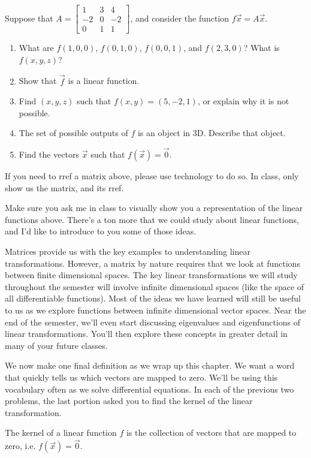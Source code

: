 \begin{problem}
 Suppose that 
$A=
\begin{bmatrix}
 1&3&4\\
 -2&0&-2\\
 0&1&1
\end{bmatrix}
$, and consider the function  $f\vec x = A\vec x$.
\begin{enumerate}
 \item What are $f(1,0,0)$, $f(0,1,0)$, $f(0,0,1)$, and $f(2,3,0)$? What is $f(x,y,z)$?
 \item Show that $\vec f$ is a linear function.
 \item Find $(x,y,z)$ such that $f(x,y)=(5,-2,1)$, or explain why it is not possible.
 \item The set of possible outputs of $f$ is an object in 3D.  Describe that object. 
 \item Find the vectors $\vec x$ such that $f(\vec x)=\vec 0$.  
\end{enumerate}
 If you need to rref a matrix above, please use technology to do so. In class, only show us the matrix, and its rref.  
\end{problem}

Make sure you ask me in class to visually show you a representation of the linear functions above.  There's a ton more that we could study about linear functions, and I'd like to introduce to you some of those ideas. 

Matrices provide us with the key examples to understanding linear transformations. However, a matrix by nature requires that we look at functions between finite dimensional spaces.  The key linear transformations we will study throughout the semester will involve infinite dimensional spaces (like the space of all differentiable functions).  Most of the ideas we have learned will still be useful to us as we explore functions between infinite dimensional vector spaces. Near the end of the semester, we'll even start discussing eigenvalues and eigenfunctions of linear transformations. You'll then explore these concepts in greater detail in many of your future classes.

We now make one final definition as we wrap up this chapter. We want a word that quickly tells us which vectors are mapped to zero. We'll be using this vocabulary often as we solve differential equations. In each of the previous two problems, the last portion asked you to find the kernel of the linear transformation.

\begin{definition}[Kernel]
 The kernel of a linear function $f$ is the collection of vectors that are mapped to zero, i.e. $f(\vec x)=\vec 0$.  
\end{definition}
 
